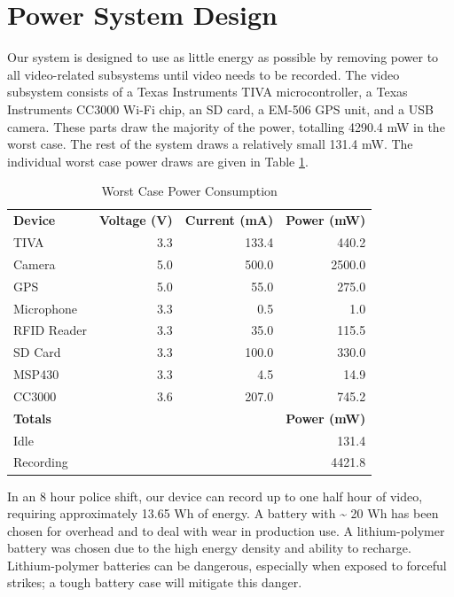 \documentclass[12pt]{article}
\begin{document}
\section{Power System Design}
Our system is designed to use as little energy as possible by removing power to
all video-related subsystems until video needs to be recorded. The video
subsystem consists of a Texas Instruments TIVA
microcontroller\cite[p.~1880]{tm4c1294ncpdt}, a Texas Instruments CC3000 Wi-Fi
chip\cite[p.~6]{cc3000}, an SD card\cite[p.~19,23]{sd_standard}, a EM-506 GPS
unit\cite[p.~10]{em506}, and a USB camera\cite[p.~245]{usb_standard}. These
parts draw the majority of the power, totalling 4290.4 mW in the worst case.
The rest of the system draws a relatively small 131.4 mW. The individual worst
case power draws are given in Table \ref{tab:worst_case_power}.

\begin{table}[h!]
    \centering
    \caption{Worst Case Power Consumption}
    \begin{tabular}{lrrr}
        \textbf{Device} & \textbf{Voltage (V)} & \textbf{Current (mA)} & \textbf{Power (mW)}\\
        TIVA & 3.3 & 133.4 & 440.2\\
        Camera & 5.0 & 500.0 & 2500.0\\
        GPS & 5.0 & 55.0 & 275.0\\
        Microphone & 3.3 & 0.5 & 1.0\\
        RFID Reader & 3.3 & 35.0 & 115.5\\
        SD Card & 3.3 & 100.0 & 330.0\\
        MSP430 & 3.3 & 4.5 & 14.9\\
        CC3000 & 3.6 & 207.0 & 745.2\\
        \hline
        \textbf{Totals} & & & \textbf{Power (mW)}\\
        Idle & & & 131.4\\
        Recording & & & 4421.8\\
    \end{tabular}
    \label{tab:worst_case_power}
\end{table}

In an 8 hour police shift, our device can record up to one half hour of video,
requiring approximately 13.65 Wh of energy. A battery with \textasciitilde{} 20
Wh has been chosen for overhead and to deal with wear in production use. A
lithium-polymer battery was chosen due to the high energy density and ability
to recharge. Lithium-polymer batteries can be dangerous, especially when
exposed to forceful strikes; a tough battery case will mitigate this danger.
\end{document}
